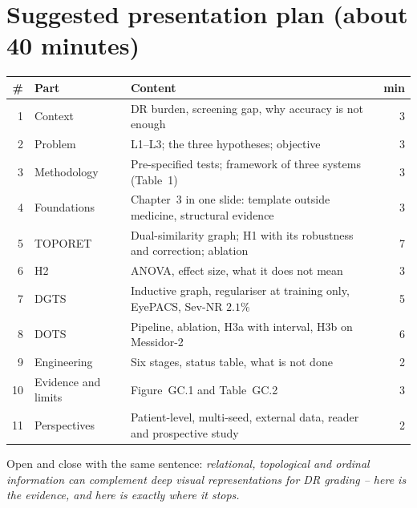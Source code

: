 \documentclass[11pt,a4paper]{article}
\begin{document}
\section{Suggested presentation plan (about 40 minutes)}
\begin{center}\small
\begin{tabular}{@{}rP{4.8cm}P{9.2cm}r@{}}
\toprule
\# & Part & Content & min \\
 & Context & DR burden, screening gap, why accuracy is not enough & 3 \\
2 & Problem & L1--L3; the three hypotheses; objective & 3 \\
3 & Methodology & Pre-specified tests; framework of three systems (Table~1) & 3 \\
4 & Foundations & Chapter~3 in one slide: template outside medicine, structural evidence & 3 \\
5 & TOPORET & Dual-similarity graph; H1 with its robustness and correction; ablation & 7 \\
6 & H2 & ANOVA, effect size, what it does not mean & 3 \\
7 & DGTS & Inductive graph, regulariser at training only, EyePACS, Sev-NR $2.1\%$ & 5 \\
8 & DOTS & Pipeline, ablation, H3a with interval, H3b on Messidor-2 & 6 \\
9 & Engineering & Six stages, status table, what is not done & 2 \\
10 & Evidence and limits & Figure~GC.1 and Table~GC.2 & 3 \\
11 & Perspectives & Patient-level, multi-seed, external data, reader and prospective study & 2 \\
\bottomrule
\end{tabular}
\end{center}
Open and close with the same sentence: \emph{relational, topological and ordinal
information can complement deep visual representations for DR grading -- here is the
evidence, and here is exactly where it stops.}
\end{document}
